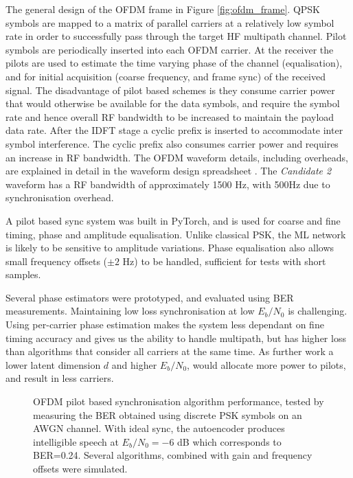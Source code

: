 \documentclass{article}
\begin{document}
The general design of the OFDM frame in Figure \ref{fig:ofdm_frame}.  QPSK symbols are mapped to a matrix of parallel carriers at a relatively low symbol rate in order to successfully pass through the target HF multipath channel. Pilot symbols are periodically inserted into each OFDM carrier.  At the receiver the  pilots are used to estimate the time varying phase of the channel (equalisation), and for initial acquisition (coarse frequency, and frame sync) of the received signal.  The disadvantage of pilot based schemes is they consume carrier power that would otherwise be available for the data symbols, and require the symbol rate and hence overall RF bandwidth to be increased to maintain the payload data rate.  After the IDFT stage a cyclic prefix is inserted to accommodate inter symbol interference.  The cyclic prefix also consumes carrier power and requires an increase in RF bandwidth.  The OFDM waveform details, including overheads, are explained in detail in the waveform design spreadsheet \cite{FreeDV-032}.  The \emph{Candidate 2} waveform has a RF bandwidth of approximately 1500 Hz, with 500Hz due to synchronisation overhead.

A pilot based sync system was built in PyTorch, and is used for coarse and fine timing, phase and amplitude equalisation.  Unlike classical PSK, the ML network is likely to be sensitive to amplitude variations.  Phase equalisation also allows small frequency offsets ($\pm2$ Hz) to be handled, sufficient for tests with short samples.

Several phase estimators were prototyped, and evaluated using BER measurements. Maintaining low loss synchronisation at low $E_b/N_0$ is challenging.  Using per-carrier phase estimation makes the system less dependant on fine timing accuracy and gives us the ability to handle multipath, but has higher loss than algorithms that consider all carriers at the same time.  As further work a lower latent dimension $d$ and higher $E_b/N_0$, would allocate more power to pilots, and result in less carriers.

\begin{figure}[h]
\caption{OFDM pilot based synchronisation algorithm performance, tested by measuring the BER obtained using discrete PSK symbols on an AWGN channel.  With ideal sync, the autoencoder produces intelligible speech at $E_b/N_0=-6$ dB which corresponds to BER=0.24.  Several algorithms, combined with gain and frequency offsets were simulated.}
\label{fig:ofdm_sync}
\begin{center}

\end{center}
\end{figure}
\end{document}
